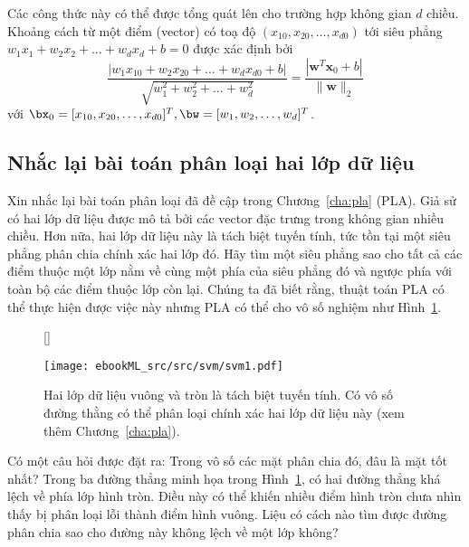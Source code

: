 Các công thức này có thể được tổng quát lên cho trường hợp không gian $d$ chiều.
Khoảng cách từ một điểm (vector) có toạ độ $(x_{10}, x_{20}, \dots, x_{d0})$ tới
{siêu phẳng} $w_1x_1 + w_2x_2 +
\dots + w_dx_d   + b = 0$ được xác định bởi
\begin{equation*} 
\frac{|w_1x_{10} + w_2x_{20} + \dots +
w_dx_{d0} + b|}{\sqrt{w_1^2 + w_2^2 + \dots +
w_d^2}} = \frac{|\mathbf{w}^T\mathbf{x}_0 + b|}{\|\mathbf{w}\|_2}
\end{equation*} 
với $\bx_0 = [x_{10}, x_{20}, \dots, x_{d0}]^T, \bw = [w_1, w_2,
\dots, w_d]^T$.
 
 
\subsection{Nhắc lại bài toán phân loại hai lớp dữ liệu}
 
Xin nhắc lại bài toán phân loại đã đề cập trong
Chương~\ref{cha:pla} (PLA). Giả sử có hai
lớp dữ liệu được mô tả bởi các vector đặc trưng trong không gian nhiều
chiều. Hơn nữa, hai lớp dữ liệu này là tách biệt tuyến tính, tức tồn
tại một siêu phẳng phân chia chính xác hai lớp đó. Hãy tìm một siêu phẳng sao cho tất cả các điểm thuộc một lớp nằm về cùng một
phía của siêu phẳng đó và ngược phía với toàn bộ các điểm thuộc lớp còn lại.
Chúng ta đã biết rằng, thuật toán PLA có thể thực hiện được việc này nhưng PLA có thể cho vô số nghiệm như Hình~\ref{fig:19_linsep}.
 
\begin{figure}[t]
    [\FBwidth]
    {\caption[]{Hai lớp dữ liệu vuông và tròn là tách biệt tuyến tính. Có
    vô số đường thằng có thể phân loại chính xác hai lớp dữ liệu này (xem
    thêm Chương~\ref{cha:pla}).}
    \label{fig:19_linsep}}
    {\texttt{[image: ebookML\_src/src/svm/svm1.pdf]}}
\end{figure}

Có một câu hỏi được đặt ra: Trong vô số các mặt phân chia đó, đâu là mặt
tốt nhất? Trong ba đường thẳng minh họa trong Hình~\ref{fig:19_linsep}, có hai
đường thẳng khá lệch về phía lớp hình tròn. Điều này có thể khiến nhiều điểm hình tròn chưa nhìn thấy bị phân loại lỗi thành điểm hình vuông. Liệu có
cách nào tìm được đường phân chia sao cho đường này không lệch về một lớp không? 

